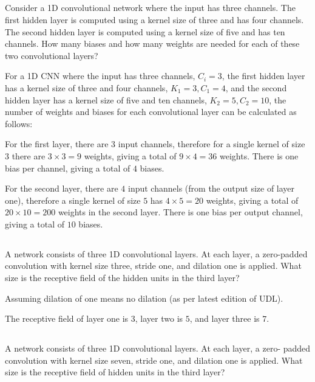 \documentclass[12pt]{report}
\begin{document}
\subsection{}
\begin{mdframed}
    Consider a 1D convolutional network where the input has three channels. The first hidden layer is computed using a kernel size of three and has four channels. The second hidden layer is computed using a kernel size of five and has ten channels. How many biases and how many weights are needed for each of these two convolutional layers?
\end{mdframed}

For a 1D CNN where the input has three channels, $C_{i} = 3$, the first hidden layer has a kernel size of three and four channels, $K_{1} = 3, C_{1} = 4$, and the second hidden layer has a kernel size of five and ten channels, $K_{2} = 5, C_{2} = 10$, the number of weights and biases for each convolutional layer can be calculated as follows:

For the first layer, there are $3$ input channels, therefore for a single kernel of size $3$ there are $3 \times 3 = 9$ weights, giving a total of $9 \times 4 = 36$ weights. There is one bias per channel, giving a total of $4$ biases.

For the second layer, there are $4$ input channels (from the output size of layer one), therefore a single kernel of size $5$ has $4 \times 5 = 20$ weights, giving a total of $20 \times 10 = 200$ weights in the second layer. There is one bias per output channel, giving a total of $10$ biases.

\newpage

\subsection{}
\begin{mdframed}
    A network consists of three 1D convolutional layers. At each layer, a zero-padded convolution with kernel size three, stride one, and dilation one is applied. What size is the receptive field of the hidden units in the third layer?
\end{mdframed}

Assuming dilation of one means no dilation (as per latest edition of UDL).

The receptive field of layer one is $3$, layer two is $5$, and layer three is $7$.

\subsection{}
\begin{mdframed}
    A network consists of three 1D convolutional layers. At each layer, a zero- padded convolution with kernel size seven, stride one, and dilation one is applied. What size is the receptive field of hidden units in the third layer?
\end{mdframed}
\end{document}
